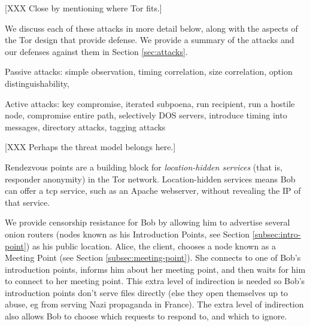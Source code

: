 \documentclass[times,10pt,twocolumn]{article}
\begin{document}
[XXX Close by mentioning where Tor fits.]

\label{subsec:threat-model}

\label{subsec:known-attacks}

We discuss each of these attacks in more detail below, along with the
aspects of the Tor design that provide defense. We provide a summary
of the attacks and our defenses against them in Section \ref{sec:attacks}.

Passive attacks:
simple observation,
timing correlation,
size correlation,
option distinguishability,

Active attacks:
key compromise,
iterated subpoena,
run recipient,
run a hostile node,
compromise entire path,
selectively DOS servers,
introduce timing into messages,
directory attacks,
tagging attacks

\label{sec:assumptions}

[XXX Perhaps the threat model belongs here.]


\label{sec:design}



\label{subsec:exitpolicies}

\label{subsec:dir-servers}

\label{sec:rendezvous}

Rendezvous points are a building block for \emph{location-hidden services}
(that is, responder anonymity) in the Tor network. Location-hidden
services means Bob can offer a tcp service, such as an Apache webserver,
without revealing the IP of that service.

We provide censorship resistance for Bob by allowing him to advertise
several onion routers (nodes known as his Introduction Points, see
Section \ref{subsec:intro-point}) as his public location. Alice,
the client, chooses a node known as a Meeting Point (see Section
\ref{subsec:meeting-point}). She connects to one of Bob's introduction
points, informs him about her meeting point, and then waits for him to
connect to her meeting point. This extra level of indirection is needed
so Bob's introduction points don't serve files directly (else they open
themselves up to abuse, eg from serving Nazi propaganda in France). The
extra level of indirection also allows Bob to choose which requests to
respond to, and which to ignore.
\end{document}

